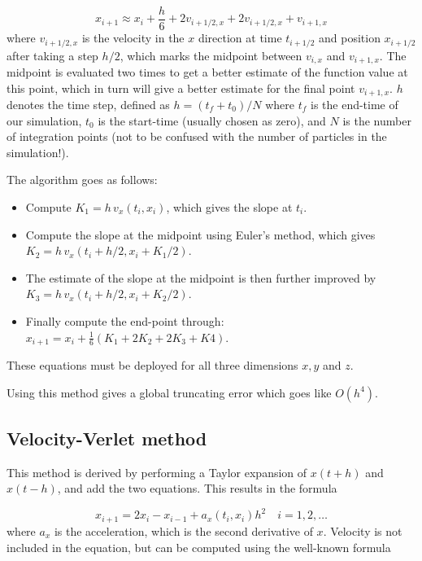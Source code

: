 \documentclass{article}
\begin{document}
\begin{multicols}{2}
\begin{equation}
	x_{i+1} \approx x_i + \frac{h}{6} + 2 v_{i + 1/2,x} + 2 v_{i + 1/2,x} + v_{i+1,x}
\end{equation}
where $v_{i + 1/2,x} $ is the velocity in the $x$ direction at time $t_{i + 1/2}$ and position $x_{i + 1/2}$ after taking a step $h/2$, which marks the midpoint between $v_{i,x}$ and $v_{i+1,x}$. The midpoint is evaluated two times to get a better estimate of the function value at this point, which in turn will give a better estimate for the final point $v_{i+1,x}$. $h$ denotes the time step, defined as $h = (t_f + t_0)/N$ where $t_f$ is the end-time of our simulation, $t_0$ is the start-time (usually chosen as zero), and $N$ is the number of integration points (not to be confused with the number of particles in the simulation!).

The algorithm goes as follows:

\begin{itemize}
	\item Compute $K_1 = h \, v_x(t_i,x_i)$, which gives the slope at $t_i$.
	\item Compute the slope at the midpoint using Euler's method, which gives $K_2 = h \, v_x(t_i + h/2, x_i + K_1/2)$.
	\item The estimate of the slope at the midpoint is then further improved by $K_3 = h \, v_x(t_i + h/2, x_i + K_2/2)$.
	\item Finally compute the end-point through: \\ $x_{i+1} = x_i + \frac{1}{6}(K_1 + 2K_2 + 2K_3 + K4)$.
\end{itemize}
These equations must be deployed for all three dimensions $x,y$ and $z$.

Using this method gives a global truncating error which goes like $O(h^4)$. 




\subsection{Velocity-Verlet method}
This method is derived by performing a Taylor expansion of $x(t+h)$ and $x(t-h)$, and add the two equations. This results in the formula

\begin{equation}\label{eq:verlet}
	x_{i+1} = 2x_i - x_{i-1} + a_x(t_i,x_i)h^2 \quad i = 1, 2, \dots
\end{equation}
where $a_x$ is the acceleration, which is the second derivative of $x$. Velocity is not included in the equation, but can be computed using the well-known formula


\end{multicols}
\end{document}
